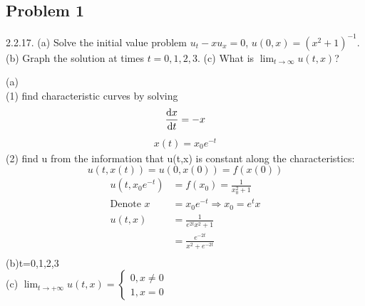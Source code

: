 \subsection*{Problem 1}
2.2.17. (a) Solve the initial value problem $u_t - xu_x = 0$, $u(0,x) = (x^2 + 1)^{-1}$.  
(b) Graph the solution at times $t=0,1,2,3$.  
(c) What is $\lim_{t \to \infty} u(t,x)$?
\begin{solution}
   (a)\\ (1) find characteristic curves by solving$$
        \dv{x}{t}=-x
    $$
    \begin{align*}{}{}
    x(t)=x_0e^{-t}
\end{align*}
    (2) find u from the information that u(t,x) is constant along the characteristics:$$
        u(t,x(t))=u(0,x(0))=f(x(0))
    $$  
    \begin{align*}{}{}
    u(t,x_0e^{-t})&=f(x_0)=\frac{1}{x_0^2+1}\\
    \text{Denote } x&=x_0e^{-t}\Rightarrow x_0=e^tx\\
    u(t,x)&=\frac{1}{e^{2t}x^2+1}\\
    &=\frac{e^{-2t}}{x^2+e^{-2t}}\\
    \end{align*}
(b)t=0,1,2,3\\
(c) $ \lim_{t\rightarrow+\infty}u(t,x)=\begin{cases}
    0, x\neq 0\\
    1, x=0
\end{cases} $ 
\end{solution}

